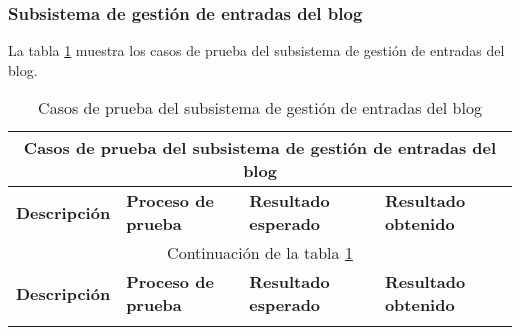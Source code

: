 \begin{landscape}
	\subsubsection{Subsistema de gestión de entradas del blog}
	La tabla \ref{table:casos_prueba_blog} muestra los casos de prueba del subsistema de gestión de entradas del blog.
	
	\begin{longtable}[c]{|p{50mm}|p{50mm}|p{50mm}|p{50mm}|}
	 \caption{Casos de prueba del subsistema de gestión de entradas del blog\label{table:casos_prueba_blog}}\\
	
	 \hline
	 \multicolumn{4}{|c|}{\textbf{Casos de prueba del subsistema de gestión de entradas del blog}}\\
	 \hline
	 \textbf{Descripción} & \textbf{Proceso de prueba} & \textbf{Resultado esperado} & \textbf{Resultado obtenido}\\
	 \hline
	 \hline
	 \endfirsthead
	 
	 \hline
	 \multicolumn{4}{|c|}{Continuación de la tabla \ref{table:casos_prueba_blog}}\\
	 \hline
	 \textbf{Descripción} & \textbf{Proceso de prueba} & \textbf{Resultado esperado} & \textbf{Resultado obtenido}\\
	 \hline
	 \hline
	 \endhead
	 
	 \hline
	 \endfoot
	 

\end{longtable}
\end{landscape}
